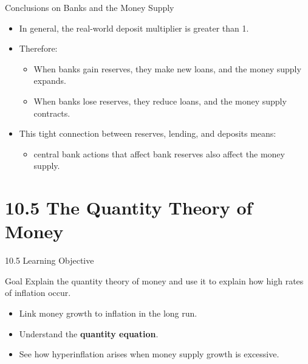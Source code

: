 \documentclass[aspectratio=169]{beamer}
\begin{document}
\begin{frame}{Conclusions on Banks and the Money Supply}
\transfade
\begin{itemize}[<+->]
  \item In general, the real-world deposit multiplier is greater than 1.
  \item Therefore:
  \begin{itemize}[<+->]
    \item When banks gain reserves, they make new loans, and the money supply \alert{expands}.
    \item When banks lose reserves, they reduce loans, and the money supply \alert{contracts}.
  \end{itemize}
  \item This tight connection between reserves, lending, and deposits means:
  \begin{itemize}[<+->]
    \item central bank actions that affect bank reserves also affect the money supply.
  \end{itemize}
\end{itemize}
\end{frame}

\section{10.5 The Quantity Theory of Money}

\begin{frame}{10.5 Learning Objective}
\transfade
\begin{block}{Goal}
Explain the quantity theory of money and use it to explain how high rates of inflation occur.
\end{block}
\begin{itemize}[<+->]
  \item Link money growth to inflation in the long run.
  \item Understand the \textbf{quantity equation}.
  \item See how hyperinflation arises when money supply growth is excessive.
\end{itemize}
\end{frame}
\end{document}
